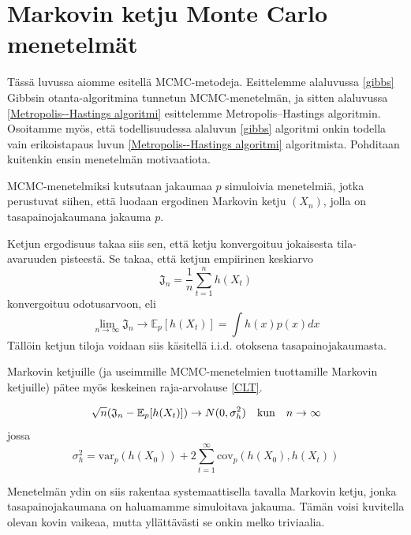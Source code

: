 \chapter{Markovin ketju Monte Carlo menetelmät}

Tässä luvussa aiomme esitellä MCMC-metodeja. Esittelemme alaluvussa \ref{gibbs} Gibbsin otanta-algoritmina tunnetun MCMC-menetelmän, ja sitten alaluvussa \ref{Metropolis--Hastings algoritmi} esittelemme Metropolis--Hastings algoritmin. Osoitamme myös, että todellisuudessa alaluvun \ref{gibbs} algoritmi onkin todella vain erikoistapaus luvun \ref{Metropolis--Hastings algoritmi} algoritmista. Pohditaan kuitenkin ensin menetelmän motivaatiota. \cite[s.~94]{koistinen_computational_2009} \cite[s.~269]{monte_carlo_book}
 
\begin{maar}
	MCMC-menetelmiksi kutsutaan jakaumaa $p$ simuloivia menetelmiä, jotka perustuvat siihen, että luodaan ergodinen Markovin ketju $(X_n)$, jolla on tasapainojakaumana jakauma $p$.
\end{maar}

Ketjun ergodisuus takaa siis sen, että ketju konvergoituu jokaisesta tila-avaruuden pisteestä. Se takaa, että ketjun empiirinen keskiarvo
\begin{equation}
	\mathfrak{J}_n = \frac{1}{n} \sum_{t=1}^{n} h(X_t)
\end{equation}
konvergoituu odotusarvoon, eli
\begin{equation}
	\lim_{n\to\infty} \mathfrak J_n \to \mathbb{E}_p[h(X_t)] = \int h(x)p(x)dx
\end{equation}
Tällöin ketjun tiloja voidaan siis käsitellä i.i.d. otoksena tasapainojakaumasta.

Markovin ketjuille (ja useimmille MCMC-menetelmien tuottamille Markovin ketjuille) pätee myös keskeinen raja-arvolause \ref{CLT}.

\begin{equation}\label{CLT}
	\sqrt{n}\qty(\mathfrak{J}_n-\mathbb{E}_p[h(X_t)]) \to N(0, \sigma^2_h) \qq{kun} n\to\infty
\end{equation}
jossa 
\begin{equation}
	\sigma^2_h = \text{var}_p(h(X_0))+2\sum_{t=1}^{\infty}\text{cov}_p(h(X_0),h(X_t))
\end{equation}

Menetelmän ydin on siis rakentaa systemaattisella tavalla Markovin ketju, jonka tasapainojakaumana on haluamamme simuloitava jakauma. Tämän voisi kuvitella olevan kovin vaikeaa, mutta yllättävästi se onkin melko triviaalia.

